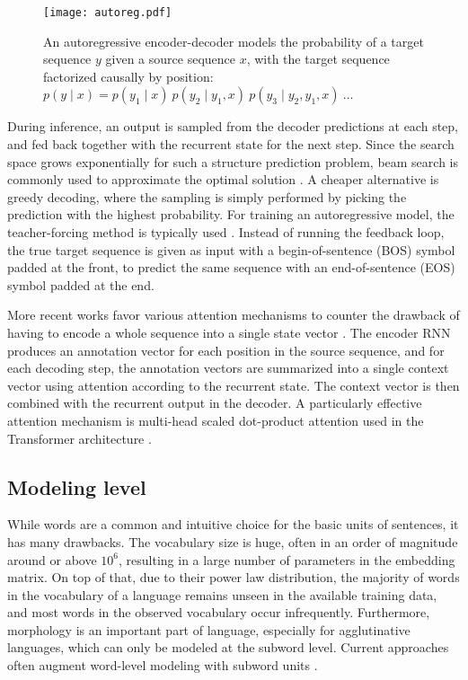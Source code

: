\documentclass[11pt,twocolumn]{article}
\begin{document}
\begin{figure}
  \centering\texttt{[image: autoreg.pdf]}
  \caption[]{\label{fig:autoreg}An autoregressive encoder-decoder models
    the probability of a target sequence \(y\) given a source sequence \(x\),
    with the target sequence factorized causally by position:
    \small{\( p(y \mid x) = p(y_{1} \mid x)\ p(y_{2} \mid y_{1}, x)\ p(y_{3} \mid y_{2}, y_{1}, x)\ \ldots \)}}
\end{figure}

During inference, an output is sampled from the decoder predictions at each step,
and fed back together with the recurrent state for the next step.
Since the search space grows exponentially for such a structure prediction problem,
beam search is commonly used to approximate the optimal solution \parencite{freitag2017beam}.
A cheaper alternative is greedy decoding,
where the sampling is simply performed by picking the prediction with the highest probability.
For training an autoregressive model,
the teacher-forcing method is typically used \parencite{williams1989learning}.
Instead of running the feedback loop,
the true target sequence is given as input with a begin-of-sentence (BOS) symbol padded at the front,
to predict the same sequence with an end-of-sentence (EOS) symbol padded at the end.

More recent works favor various attention mechanisms to counter
the drawback of having to encode a whole sequence into a single state vector
\parencite{bahdanau2014neural,luong2015effective}.
The encoder RNN produces an annotation vector for each position in the source sequence,
and for each decoding step,
the annotation vectors are summarized into a single context vector using attention
according to the recurrent state.
The context vector is then combined with the recurrent output in the decoder.
A particularly effective attention mechanism is multi-head scaled dot-product attention
used in the Transformer architecture \parencite{vaswani2017attention}.

\subsection{Modeling level}\label{sec:modeling-level}

While words are a common and intuitive choice for the basic units of sentences,
it has many drawbacks.
The vocabulary size is huge, often in an order of magnitude around or above \(10^{6}\),
resulting in a large number of parameters in the embedding matrix.
On top of that, due to their power law distribution,
the majority of words in the vocabulary of a language remains unseen in the available training data,
and most words in the observed vocabulary occur infrequently.
Furthermore, morphology is an important part of language,
especially for agglutinative languages,
which can only be modeled at the subword level.
Current approaches often augment word-level modeling with subword units \parencite{sennrich2015neural,kudo2018subword}.
\end{document}
